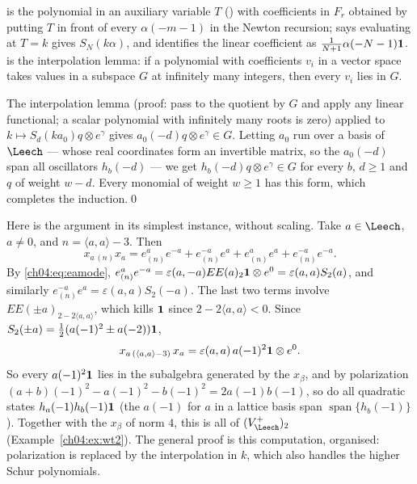 \begin{dictionary}
 is the polynomial in an auxiliary variable $T$ () with
coefficients in $F_r$ obtained by putting $T$ in front of every $\alpha(-m-1)$ in the Newton
recursion;  says evaluating at $T=k$ gives $S_N(k\alpha)$, and
 identifies the linear coefficient as $\tfrac1{N+1}\alpha(-N-1)\mathbf{1}$.
 is the interpolation lemma: if a polynomial with coefficients
$v_i$ in a vector space takes values in a subspace $G$ at infinitely many integers, then every
$v_i$ lies in $G$.
\end{dictionary}

The interpolation lemma (proof: pass to the quotient by $G$ and apply any linear functional; a
scalar polynomial with infinitely many roots is zero) applied to $k\mapsto S_d(ka_0)q\otimes e^\gamma$
gives $a_0(-d)q\otimes e^\gamma\in G$. Letting $a_0$ run over a basis of $\Leech$ --- whose real
coordinates form an invertible matrix, so the $a_0(-d)$ span all oscillators $h_b(-d)$ --- we get
$h_b(-d)q\otimes e^\gamma\in G$ for every $b$, $d\ge1$ and $q$ of weight $w-d$. Every monomial of
weight $w\ge1$ has this form, which completes the induction.\qed

\begin{example}\label{ch04:ex:genwt2}
Here is the argument in its simplest instance, without scaling. Take $a\in\Leech$, $a\neq0$, and
$n=\langle a,a\rangle-3$. Then
\begin{equation*}
  x_{a\,(n)}x_a=e^a_{(n)}e^{-a}+e^{-a}_{(n)}e^{a}+e^a_{(n)}e^a+e^{-a}_{(n)}e^{-a}.
\end{equation*}
By \eqref{ch04:eq:eamode}, $e^a_{(n)}e^{-a}=\varepsilon(a,-a)EE(a)_{2}\mathbf{1}\otimes e^0=\varepsilon(a,a)S_2(a)$,
and similarly $e^{-a}_{(n)}e^a=\varepsilon(a,a)S_2(-a)$. The last two terms involve $EE(\pm a)_{2-2\langle a,a\rangle}$,
which kills $\mathbf{1}$ since $2-2\langle a,a\rangle<0$. Since $S_2(\pm a)=\tfrac12(a(-1)^2\pm a(-2))\mathbf{1}$,
\begin{equation*}
  x_{a\,(\langle a,a\rangle-3)}\,x_a=\varepsilon(a,a)\,a(-1)^2\mathbf{1}\otimes e^0 .
\end{equation*}
So every $a(-1)^2\mathbf{1}$ lies in the subalgebra generated by the $x_\beta$, and by polarization
$(a+b)(-1)^2-a(-1)^2-b(-1)^2=2a(-1)b(-1)$, so do all quadratic states $h_a(-1)h_b(-1)\mathbf{1}$
(the $a(-1)$ for $a$ in a lattice basis span $\operatorname{span}\{h_b(-1)\}$). Together with the
$x_\beta$ of norm $4$, this is all of $(V_\Leech^+)_2$ (Example~\ref{ch04:ex:wt2}). The general proof
is this computation, organised: polarization is replaced by the interpolation in $k$, which also
handles the higher Schur polynomials.
\end{example}

